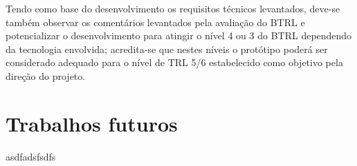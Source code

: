 Tendo como base do desenvolvimento os requisitos técnicos levantados, deve-se também observar os comentários levantados pela avaliação do BTRL e potencializar o desenvolvimento para atingir o nível 4 ou 3 do BTRL dependendo da tecnologia envolvida; acredita-se que nestes níveis o protótipo poderá ser considerado adequado para o nível de TRL 5/6 estabelecido como objetivo pela direção do projeto.

\section{Trabalhos futuros}
\label{sec:trabfut}
asdfadsfsdfs





